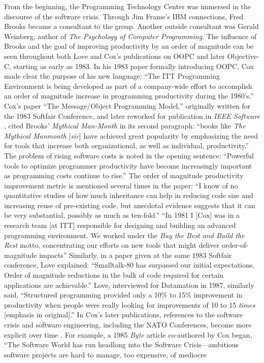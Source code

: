 \documentclass[acmsmall]{acmart}\settopmatter{}
\begin{document}
From the beginning, the Programming Technology Center was immersed in the discourse of the software crisis. Through Jim Frame's IBM connections, Fred Brooks became a consultant to the group. Another outside consultant was Gerald Weinberg, author of \emph{The Psychology of Computer Programming}. The influence of Brooks and the goal of improving productivity by an order of magnitude can be seen throughout both Love and Cox's publications on OOPC and later Objective-C, starting as early as 1983. In his 1983 paper formally introducing OOPC, Cox made clear the purpose of his new language: ``The ITT Programming Environment is being developed as part of a company-wide effort to accomplish an order of magnitude increase in programming productivity during the 1980's.'' \citep[15]{cox_object_1983} Cox's paper ``The Message/Object Programming Model,'' originally written for the 1983 Softfair Conference, and later reworked for publication in \emph{IEEE Software} \citetext{\citealp[51]{cox_message/object_1983}; \citealp[50]{cox_message/object_1984}}, cited Brooks' \emph{Mythical Man-Month} \citep{brooks_mythical_1995} in its second paragraph: ``books like \emph{The Mythical Manmonth} [\emph{sic}] have achieved great popularity by emphasizing the need for tools that increase both organizational, as well as individual, productivity.'' The problem of rising software costs is noted in the opening sentence: ``Powerful tools to optimize programmer productivity have become increasingly important as programming costs continue to rise.''  The order of magnitude productivity improvement metric is mentioned several times in the paper: ``I know of no quantitative studies of how much inheritance can help in reducing code size and increasing reuse of pre-existing code, but anecdotal evidence suggests that it can be very substantial, possibly as much as ten-fold.'' \citep[56]{cox_message/object_1983} ``In 1981 I [Cox] was in a research team [at ITT] responsible for designing and building an advanced programming environment. We worked under the \emph{Buy the Best and Build the Rest} motto, concentrating our efforts on new tools that might deliver order-of-magnitude impacts'' \citep[57]{cox_message/object_1983} Similarly, in a paper given at the same 1983 Softfair conference, Love explained: ``Smalltalk-80 has surpassed our initial expectations. Order of magnitude reductions in the bulk of code required for certain applications are achievable.'' \citep[61]{love_experiences_1983} Love, interviewed for Datamation in 1987, similarly said, ``Structured programming\textellipsis{} provided only a 10\% to 15\% improvement in productivity when people were really looking for improvements of 10 to 15 \emph{times} [emphasis in original].'' \citep{verity_oops_1987} In Cox's later publications, references to the software crisis and software engineering, including the NATO Conferences, become more explicit over time \citetext{\citealp[3]{cox_object-oriented_1986};  \citealp[25]{cox_planning_1990}; \citealp[209]{cox_there_1990}; \citealp[iii--iv, 3]{cox_object-oriented_1991}}. For example, a 1985 \emph{Byte} article co-authored by Cox began, ``The Software World has run headlong into the Software Crisis---ambitious software projects are hard to manage, too expensive, of mediocre 
\end{document}
